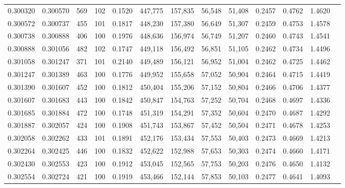 \begin{tabular}{rrrrrrrrrrrrr}
0.300320 & 0.300570 &   569 & 102 &                                     0.1520 & 447,775 & 157,835 &  56,548 &  51,408 & 0.2457 & 0.4762 & 1.4620 \\
0.300572 & 0.300737 &   455 & 101 &                                     0.1817 & 448,230 & 157,380 &  56,649 &  51,307 & 0.2459 & 0.4753 & 1.4578 \\
0.300738 & 0.300888 &   406 & 100 &                                     0.1976 & 448,636 & 156,974 &  56,749 &  51,207 & 0.2460 & 0.4743 & 1.4541 \\
0.300888 & 0.301056 &   482 & 102 &                                     0.1747 & 449,118 & 156,492 &  56,851 &  51,105 & 0.2462 & 0.4734 & 1.4496 \\
0.301058 & 0.301247 &   371 & 101 &                                     0.2140 & 449,489 & 156,121 &  56,952 &  51,004 & 0.2462 & 0.4725 & 1.4462 \\
0.301247 & 0.301389 &   463 & 100 &                                     0.1776 & 449,952 & 155,658 &  57,052 &  50,904 & 0.2464 & 0.4715 & 1.4419 \\
0.301390 & 0.301607 &   452 & 100 &                                     0.1812 & 450,404 & 155,206 &  57,152 &  50,804 & 0.2466 & 0.4706 & 1.4377 \\
0.301607 & 0.301683 &   443 & 100 &                                     0.1842 & 450,847 & 154,763 &  57,252 &  50,704 & 0.2468 & 0.4697 & 1.4336 \\
0.301685 & 0.301884 &   472 & 100 &                                     0.1748 & 451,319 & 154,291 &  57,352 &  50,604 & 0.2470 & 0.4687 & 1.4292 \\
0.301887 & 0.302057 &   424 & 100 &                                     0.1908 & 451,743 & 153,867 &  57,452 &  50,504 & 0.2471 & 0.4678 & 1.4253 \\
0.302058 & 0.302262 &   433 & 101 &                                     0.1891 & 452,176 & 153,434 &  57,553 &  50,403 & 0.2473 & 0.4669 & 1.4213 \\
0.302264 & 0.302425 &   446 & 100 &                                     0.1832 & 452,622 & 152,988 &  57,653 &  50,303 & 0.2474 & 0.4660 & 1.4171 \\
0.302430 & 0.302553 &   423 & 100 &                                     0.1912 & 453,045 & 152,565 &  57,753 &  50,203 & 0.2476 & 0.4650 & 1.4132 \\
0.302554 & 0.302724 &   421 & 100 &                                     0.1919 & 453,466 & 152,144 &  57,853 &  50,103 & 0.2477 & 0.4641 & 1.4093 \\

\end{tabular}
